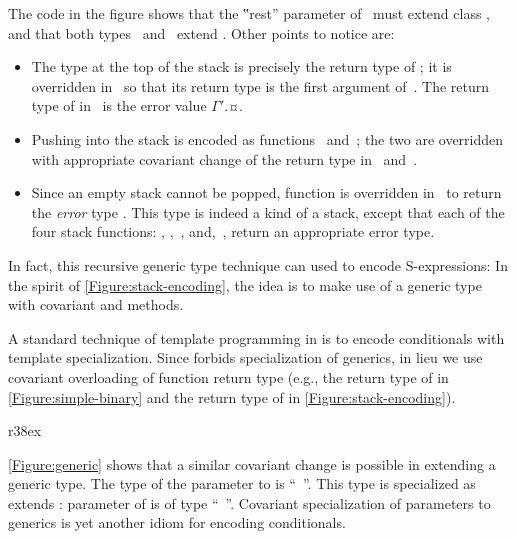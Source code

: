 \documentclass[a4paper,USenglish]{lipics-v2016}
\def\ReplaceInThesis#1#2{#1}
\begin{document}
The code in the figure shows that the ‟rest” parameter of~ must extend class ,
  and that both types~ and~ extend .
Other points to notice are:
\begin{itemize}
  \item The type at the top of the stack is precisely the return type of ;
        it is overridden in~ so that its return type is the first argument of~.
        The return type of  in~ is the error value {$Γ'$.¤}.
  \item Pushing into the stack is encoded as functions~ and~;
        the two are overridden with appropriate covariant change of the return type in~ and~.
  \item Since an empty stack cannot be popped, function  is overridden in~ to return
    the \emph{error} type . This type is indeed a kind of a stack, except that each of the four stack
        functions: , ,~, and,~, return an appropriate error type.
\end{itemize}
In fact, this recursive generic type technique can used to encode S-expressions: In the spirit of
  \cref{Figure:stack-encoding\ReplaceInThesis{}{-b}}, the idea is to make use of a  generic type
  with covariant  and  methods.

A standard technique of template programming in \CC is to encode conditionals with template specialization.
Since \Java forbids specialization of generics, in lieu we use covariant overloading of function
return type (e.g., the return type of  in \cref{Figure:simple-binary\ReplaceInThesis{}{-a}} and the
  return type of  in \cref{Figure:stack-encoding\ReplaceInThesis{}{-b}}).

\ReplaceInThesis{\begin{wrapfigure}[6]r{38ex}
  \caption{\label{Figure:generic} Covariance of parameters to generics}
  \javaInput[minipage,]{mammal.listing}
\end{wrapfigure}
}{  \begin{figure}[ht]
  \caption{\label{Figure:generic} Covariance of parameters to generics}
\javaInput[minipage,left=-2ex,width=\linewidth]{mammal.listing}
\end{figure}
}
\cref{Figure:generic} shows that a similar covariant change is possible 
  in extending a generic type.
The type of the parameter  
  to  is ``\mbox{  }''.
This type is specialized as  extends :
  parameter  of  is of type  
  ``\mbox{  }''.
Covariant specialization of parameters to generics 
  is yet another idiom for encoding conditionals.
\end{document}
